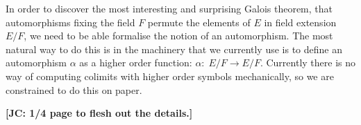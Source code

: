 In order to discover the most interesting and surprising Galois
theorem, that automorphisms fixing the field $F$ permute the elements
of $E$ in field extension $E/F$, we need to be able formalise the
notion of an automorphism. The most natural way to do this is in the
machinery that we currently use is to define an automorphism $\alpha$
as a higher order function: $\alpha:\; E/F \to E/F$. Currently there
is no way of computing colimits with higher order symbols
mechanically, so we are constrained to do this on paper.


\textbf{[JC: 1/4 page to flesh out the details.]}
\newpage

